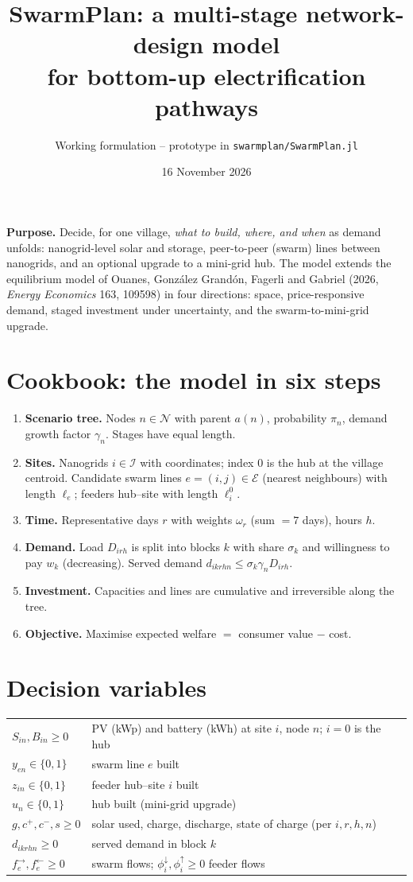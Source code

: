 \documentclass[11pt,a4paper]{article}
\title{SwarmPlan: a multi-stage network-design model\\ for bottom-up electrification pathways}
\author{Working formulation -- prototype in \texttt{swarmplan/SwarmPlan.jl}}
\date{16 November 2026}
\begin{document}
\maketitle

\noindent\textbf{Purpose.} Decide, for one village, \emph{what to build, where, and when} as demand
unfolds: nanogrid-level solar and storage, peer-to-peer (swarm) lines between nanogrids, and
an optional upgrade to a mini-grid hub. The model extends the equilibrium model of Ouanes,
Gonz\'alez Grand\'on, Fagerli and Gabriel (2026, \emph{Energy Economics} 163, 109598) in four
directions: space, price-responsive demand, staged investment under uncertainty, and the
swarm-to-mini-grid upgrade.

\section{Cookbook: the model in six steps}
\begin{enumerate}
  \item \textbf{Scenario tree.} Nodes $n\in\mathcal{N}$ with parent $a(n)$, probability $\pi_n$,
        demand growth factor $\gamma_n$. Stages have equal length.
  \item \textbf{Sites.} Nanogrids $i\in\mathcal{I}$ with coordinates; index $0$ is the hub at the
        village centroid. Candidate swarm lines $e=(i,j)\in\mathcal{E}$ (nearest neighbours) with
        length $\ell_e$; feeders hub--site with length $\ell_i^{0}$.
  \item \textbf{Time.} Representative days $r$ with weights $\omega_r$ (sum $=7$ days), hours $h$.
  \item \textbf{Demand.} Load $D_{irh}$ is split into blocks $k$ with share $\sigma_k$ and
        willingness to pay $w_k$ (decreasing). Served demand $d_{ikrhn}\le\sigma_k\gamma_nD_{irh}$.
  \item \textbf{Investment.} Capacities and lines are cumulative and irreversible along the tree.
  \item \textbf{Objective.} Maximise expected welfare $=$ consumer value $-$ cost.
\end{enumerate}

\section{Decision variables}
\begin{tabular}{@{}ll@{}}
\toprule
$S_{in},B_{in}\ge0$ & PV (kWp) and battery (kWh) at site $i$, node $n$; $i=0$ is the hub\\
$y_{en}\in\{0,1\}$ & swarm line $e$ built\\
$z_{in}\in\{0,1\}$ & feeder hub--site $i$ built\\
$u_n\in\{0,1\}$ & hub built (mini-grid upgrade)\\
$g,c^{+},c^{-},s\ge0$ & solar used, charge, discharge, state of charge (per $i,r,h,n$)\\
$d_{ikrhn}\ge0$ & served demand in block $k$\\
$f_{e}^{\rightarrow},f_{e}^{\leftarrow}\ge0$ & swarm flows; $\phi_i^{\downarrow},\phi_i^{\uparrow}\ge0$ feeder flows\\
\bottomrule
\end{tabular}
\end{document}

